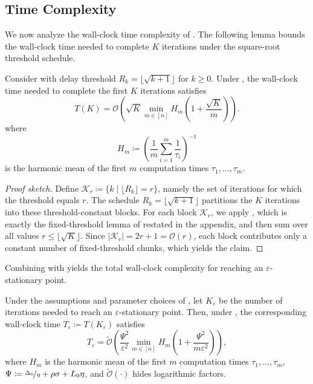 \documentclass{article}
\begin{document}
\subsection{Time Complexity}
% 
We now analyze the wall-clock time complexity of .
The following lemma bounds the wall-clock time needed to complete $K$ iterations under the square-root threshold schedule.
% 
\begin{lemma}\label{lemma:time_sqrt}
  Consider  with delay threshold $R_k = \lfloor \sqrt{k+1} \rfloor$ for $k \ge 0$.
  Under , the wall-clock time needed to complete the first $K$ iterations satisfies
  \begin{equation*}
      T(K) = \mathcal{O}\left( \sqrt{K} \min_{m \in [n]} H_m \left( 1 + \frac{\sqrt{K}}{m} \right) \right).
  \end{equation*}
  where
  \begin{equation*}
      H_m \coloneqq \left(\frac{1}{m}\sum_{i=1}^{m}\frac{1}{\tau_i}\right)^{-1}
  \end{equation*}
  is the harmonic mean of the first $m$ computation times $\tau_1,\dots,\tau_m$.
\end{lemma}
% 
\begin{proof}[Proof sketch]
  Define $\mathcal{K}_r \coloneqq \{k \mid \lfloor R_k \rfloor = r\}$, namely the set of iterations for which the threshold equals $r$.
  The schedule $R_k = \lfloor \sqrt{k+1} \rfloor$ partitions the $K$ iterations into these threshold-constant blocks.
  For each block $\mathcal{K}_r$, we apply , which is exactly the fixed-threshold lemma of \citet{maranjyan2025ringmaster} restated in the appendix, and then sum over all values $r \le \lfloor \sqrt{K} \rfloor$.
  Since $|\mathcal{K}_r| = 2r+1 = \mathcal{O}(r)$, each block contributes only a constant number of fixed-threshold chunks, which yields the claim.
\end{proof}
% 
Combining  with  yields the total wall-clock complexity for reaching an $\varepsilon$-stationary point.
% 
\begin{theorem}\label{thm:time_complexity}
  Under the assumptions and parameter choices of , let $K_\varepsilon$ be the number of iterations needed to reach an $\varepsilon$-stationary point.
  Then, under , the corresponding wall-clock time
  $T_\varepsilon \coloneqq T(K_\varepsilon)$ satisfies
  \begin{equation*}
      T_\varepsilon
      =
      \widetilde{\mathcal{O}}\left(
          \frac{\Psi^2}{\varepsilon^2}
          \min_{m \in [n]} H_m \left(
              1 + \frac{\Psi^2}{m\varepsilon^2}
          \right)
      \right) ,
  \end{equation*}
  where $H_m$ is the harmonic mean of the first $m$ computation times $\tau_1,\dots,\tau_m$, $\Psi \coloneqq \nicefrac{\Delta_0}{\eta} + \rho \sigma + L_0\eta$, and $\widetilde{\mathcal{O}}(\cdot)$ hides logarithmic factors.
\end{theorem}
\end{document}
